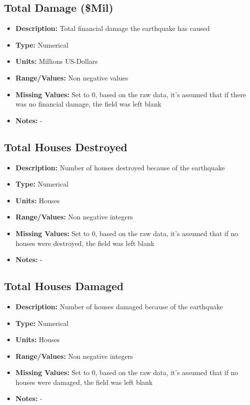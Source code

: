 \documentclass{article}
\begin{document}
\subsection{Total Damage (\$Mil)}
\begin{itemize}
    \item \textbf{Description:} Total financial damage the earthquake has caused
    \item \textbf{Type:} Numerical
    \item \textbf{Units:} Millions US-Dollars
    \item \textbf{Range/Values:} Non negative values 
    \item \textbf{Missing Values:} Set to 0, based on the raw data, it's assumed that if there was no financial damage, the field was left blank
    \item \textbf{Notes:} -
\end{itemize}


\subsection{Total Houses Destroyed}
\begin{itemize}
    \item \textbf{Description:} Number of houses destroyed because of the earthquake
    \item \textbf{Type:} Numerical
    \item \textbf{Units:} Houses
    \item \textbf{Range/Values:} Non negative integers
    \item \textbf{Missing Values:} Set to 0, based on the raw data, it's assumed that if no houses were destroyed, the field was left blank
    \item \textbf{Notes:} -
\end{itemize}

\subsection{Total Houses Damaged}
\begin{itemize}
    \item \textbf{Description:} Number of houses damaged because of the earthquake
    \item \textbf{Type:} Numerical
    \item \textbf{Units:} Houses
    \item \textbf{Range/Values:} Non negative integers
    \item \textbf{Missing Values:} Set to 0, based on the raw data, it's assumed that if no houses were damaged, the field was left blank
    \item \textbf{Notes:} -
\end{itemize}
\end{document}
